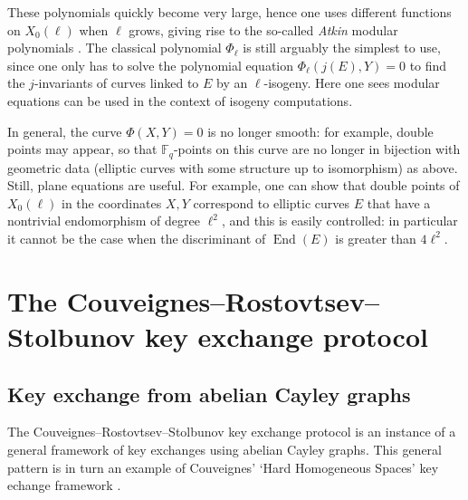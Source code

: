 \documentclass{article}
\newcommand{\F}{\mathbb{F}}
\theoremstyle{definition}
\DeclareMathOperator{\End}{End}
\begin{document}
These polynomials quickly become very large, hence one uses different 
functions on $X_0(\ell)$ when $\ell$ grows, giving rise to the 
so-called \emph{Atkin} modular polynomials \cite{}. The classical polynomial $\Phi_\ell$ 
is still arguably the simplest to use, since one only has to solve the 
polynomial equation $\Phi_\ell(j(E), Y) = 0$ to find the $j$-invariants of 
curves linked to $E$ by an $\ell$-isogeny. Here one sees modular
equations can be used in the context of isogeny computations.

In general, the curve $\Phi(X, Y) = 0$ is no longer smooth: for example, double 
points may appear, so that $\F_q$-points on this curve are no longer in bijection 
with geometric data (elliptic curves with some structure up to isomorphism)
as above. Still, plane equations are useful. For example, 
one can show that double points of $X_0(\ell)$ in the coordinates $X, Y$ 
correspond to elliptic curves $E$ that have a nontrivial endomorphism of degree 
$\ell^2$, and this is easily controlled: in particular it cannot be the case
when the discriminant of $\End(E)$ is greater than $4\ell^2$.


\section{The Couveignes--Rostovtsev--Stolbunov key exchange protocol}
\label{sec:keyex}

\subsection{Key exchange from abelian Cayley graphs}

The Couveignes--Rostovtsev--Stolbunov key exchange protocol \cite{}
is an instance of a general
framework of key exchanges using abelian Cayley graphs. This general pattern
is in turn an example of Couveignes' `Hard Homogeneous Spaces' key echange
framework \cite{}.
\end{document}
